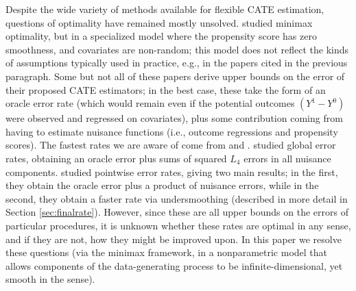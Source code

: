 \documentclass[11pt,twoside]{article}
\newcommand{\Holder}{\text{H\"{o}lder}}
\theoremstyle{definition}
\theoremstyle{remark}
\begin{document}
Despite the wide variety of methods available for flexible CATE estimation, questions of optimality have remained mostly unsolved. \citet{gao2020minimax} studied minimax optimality, but in a specialized model where the propensity score has zero smoothness, and covariates are non-random; this model does not reflect the kinds of assumptions typically used in practice, e.g., in the papers cited in the previous paragraph.  Some but not all of these papers derive upper bounds on the error of their proposed CATE estimators; in the best case, these take the form of an oracle error rate (which would remain even if the potential outcomes $(Y^1-Y^0)$ were observed and regressed on covariates), plus some contribution coming from having to estimate nuisance functions (i.e., outcome regressions and propensity scores). The fastest rates we are aware of come from \citet{foster2019orthogonal} and \citet{kennedy2023towards}. \citet{foster2019orthogonal} studied global error rates, obtaining an oracle error plus sums of squared $L_4$ errors in all nuisance components. \citet{kennedy2023towards} studied pointwise error rates, giving two main results; in the first, they obtain the oracle error plus a product of nuisance errors, while in the second, they obtain a faster rate via undersmoothing (described in more detail in Section \ref{sec:finalrate}). However, since these are all upper bounds on the errors of particular procedures, it is unknown whether these rates are optimal in any sense, and if they are not, how they might be improved upon. In this paper we resolve these questions (via the minimax framework, in a nonparametric model that allows components of the data-generating process to be infinite-dimensional, yet smooth in the \Holder{} sense). \\
\end{document}
